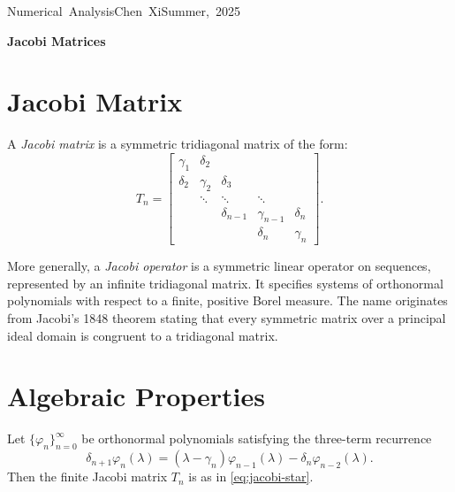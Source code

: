 \documentclass[a4paper, 10pt]{article}
\begin{document}
\hfill\vbox{\hbox{Numerical Analysis}\hbox{Chen Xi}\hbox{Summer, 2025}}

\begin{center}\Large
    \textbf{Jacobi Matrices}
\end{center}

\section{Jacobi Matrix}
A \emph{Jacobi matrix} is a symmetric tridiagonal matrix of the form:
\begin{equation}\label{eq:jacobi-star}
T_n =
\begin{bmatrix}
\gamma_1 & \delta_2 &        &        &       \\
\delta_2 & \gamma_2 & \delta_3 &        &       \\
         & \ddots  & \ddots   & \ddots &       \\
         &         & \delta_{n-1} & \gamma_{n-1} & \delta_n \\
         &         &        & \delta_n & \gamma_n
\end{bmatrix}.
\tag{$*$}
\end{equation}

More generally, a \emph{Jacobi operator} is a symmetric linear operator on sequences, represented by an infinite tridiagonal matrix. It specifies systems of orthonormal polynomials with respect to a finite, positive Borel measure. The name originates from Jacobi's 1848 theorem stating that every symmetric matrix over a principal ideal domain is congruent to a tridiagonal matrix.

\section{Algebraic Properties}

Let $\{\varphi_n\}_{n=0}^\infty$ be orthonormal polynomials satisfying the three-term recurrence
\begin{equation}\label{eq:three-term-varphi}
\delta_{n+1}\varphi_{n}(\lambda) = (\lambda - \gamma_n)\varphi_{n-1}(\lambda) - \delta_n\varphi_{n-2}(\lambda).
\end{equation}
Then the finite Jacobi matrix $T_n$ is as in \eqref{eq:jacobi-star}.
\end{document}
